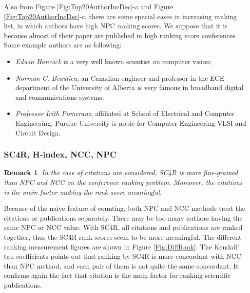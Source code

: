 \documentclass[10pt,leqno,twoside]{article}
\newtheorem{remark}{\indent Remark}[section]
\begin{document}
Also from Figure \ref{Fig:Top20AuthorIncDec}-a and Figure \ref{Fig:Top20AuthorIncDec}-c, there are some special cases in increasing ranking list, in which authors have high NPC ranking scores. We suppose that it is because almost of their paper are published in high ranking score conferences. Some example authors are as following:
\begin{itemize}
\item \textit{Edwin Hancock} is a very well known scientist on computer vision;
\item \textit{Norman C. Beaulieu}, an Canadian engineer and professor in the ECE department of the University of Alberta is very famous in broadband digital and communications systems;
\item \textit{Professor Irith Pomeranz}, affiliated at School of Electrical and Computer Engineering, Purdue University %
is noble for Computer Engineering
VLSI and Circuit Design.
\end{itemize}
\subsubsection{SC4R, H-index, NCC, NPC}
\begin{remark}
In the case of citations are considered, SC4R is more fine-grained than NPC and NCC on the conference ranking problem. Moreover, the citations is the main factor making the rank score meaningful.
\end{remark}

Because of the naive feature of counting, both NPC and NCC methods treat the citations or publications separately. There may be too many authors having the same NPC or NCC value. With SC4R, all citations and publications are ranked together, thus the SC4R rank scores seem to be more meaningful.
The different ranking measurement figures are shown in Figure \ref{Fig:DiffRank}.
The Kendall' tau coefficients points out that ranking by SC4R is more concordant with NCC than NPC method, and each pair of them is not quite the same concordant. It confirms again the fact that citation is the main factor for ranking scientific publications.
\end{document}
